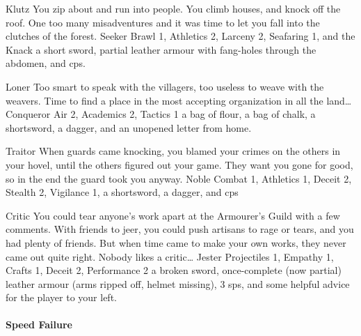 \begin{multicols}{2}
\begin{itemize}
    {Klutz}%
    {
      You zip about and run into people.
      You climb houses, and knock off the roof.
      One too many misadventures and it was time to let you fall into the clutches of the forest.
    }%
    {Seeker}%
    {Brawl 1, Athletics 2, Larceny 2, Seafaring 1, and the Knack \charge}%
    {a short sword, partial leather armour with fang-holes through the abdomen, and  \glspl{cp}.}%

    {Loner}%
    {
      Too smart to speak with the villagers, too useless to weave with the weavers.
      Time to find a place in the most accepting organization in all the land\ldots
    }%
    {Conqueror}%
    {
      Air 2, Academics 2, Tactics 1
    }%
    {a bag of flour, a bag of chalk, a shortsword, a dagger, and an unopened letter from home.}%

    {Traitor}%
    {
      When guards came knocking, you blamed your crimes on the others in your hovel, until the others figured out your game.
      They want you gone for good, so in the end the \gls{guard} took you anyway.
    }%
    {Noble}%
    {
      Combat 1, Athletics 1, Deceit 2, Stealth 2, Vigilance 1,
    }%
    {a shortsword, a dagger, and  \glspl{cp}}%

    {Critic}%
    {
      You could tear anyone's work apart at the Armourer's Guild with a few comments.
      With friends to jeer, you could push artisans to rage or tears, and you had plenty of friends.
      But when time came to make your own works, they never came out quite right.
      Nobody likes a critic\ldots
    }%
    {Jester}%
    {
      Projectiles 1, Empathy 1, Crafts 1, Deceit 2, Performance 2
    }%
    {a broken sword, once-complete (now partial) leather armour (arms ripped off, helmet missing), 3 \glspl{sp}, and some helpful advice for the player to your left.}%

\end{itemize}

\paragraph{Speed Failure}

\begin{itemize}


\end{itemize}
\end{multicols}
